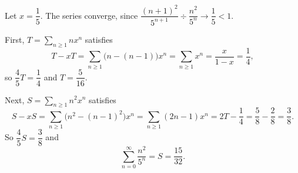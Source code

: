 Let $x=\dfrac15$. The series converge, since $\dfrac{(n+1)^2}{5^{n+1}}\div\dfrac{n^2}{5^n}\to\dfrac15<1$.

First, $T=\displaystyle\sum_{n\ge1}nx^n$ satisfies
\[T-xT=\sum_{n\ge1}\bigl(n-(n-1)\bigr)x^n=\sum_{n\ge1}x^n=\dfrac{x}{1-x}=\dfrac14,\]
so $\dfrac45T=\dfrac14$ and $T=\dfrac{5}{16}$.

Next, $S=\displaystyle\sum_{n\ge1}n^2x^n$ satisfies
\[S-xS=\sum_{n\ge1}\bigl(n^2-(n-1)^2\bigr)x^n=\sum_{n\ge1}(2n-1)x^n=2T-\dfrac14=\dfrac58-\dfrac28=\dfrac38.\]
So $\dfrac45S=\dfrac38$ and
\[\sum_{n=0}^{\infty}\dfrac{n^2}{5^n}=S=\boxed{\dfrac{15}{32}}.\]
